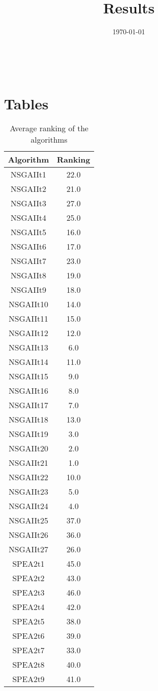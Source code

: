 \documentclass{article}
\title{Results}
\author{}
\date{\today}
\begin{document}
\oddsidemargin 0in \topmargin 0in\maketitle
\
\section{Tables}
\begin{table}[!htp]
\centering
\caption{Average ranking of the algorithms}
\begin{tabular}{c|c}
Algorithm&Ranking\\
\hline
NSGAIIt1&22.0\\
NSGAIIt2&21.0\\
NSGAIIt3&27.0\\
NSGAIIt4&25.0\\
NSGAIIt5&16.0\\
NSGAIIt6&17.0\\
NSGAIIt7&23.0\\
NSGAIIt8&19.0\\
NSGAIIt9&18.0\\
NSGAIIt10&14.0\\
NSGAIIt11&15.0\\
NSGAIIt12&12.0\\
NSGAIIt13&6.0\\
NSGAIIt14&11.0\\
NSGAIIt15&9.0\\
NSGAIIt16&8.0\\
NSGAIIt17&7.0\\
NSGAIIt18&13.0\\
NSGAIIt19&3.0\\
NSGAIIt20&2.0\\
NSGAIIt21&1.0\\
NSGAIIt22&10.0\\
NSGAIIt23&5.0\\
NSGAIIt24&4.0\\
NSGAIIt25&37.0\\
NSGAIIt26&36.0\\
NSGAIIt27&26.0\\
SPEA2t1&45.0\\
SPEA2t2&43.0\\
SPEA2t3&46.0\\
SPEA2t4&42.0\\
SPEA2t5&38.0\\
SPEA2t6&39.0\\
SPEA2t7&33.0\\
SPEA2t8&40.0\\
SPEA2t9&41.0\\

\end{tabular}
\end{table}
\end{document}
